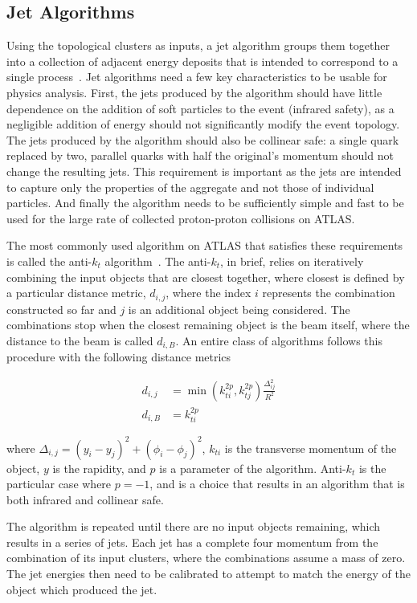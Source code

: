 \subsection{Jet Algorithms}
Using the topological clusters as inputs, a jet algorithm groups them together into a collection of adjacent energy deposits that is intended to correspond to a single process~\cite{ATL-PHYS-PUB-2015-036}.
Jet algorithms need a few key characteristics to be usable for physics analysis.
First, the jets produced by the algorithm should have little dependence on the addition of soft particles to the event (infrared safety), as a negligible addition of energy should not significantly modify the event topology.
The jets produced by the algorithm should also be collinear safe: a single quark replaced by two, parallel quarks with half the original's momentum should not change the resulting jets.
This requirement is important as the jets are intended to capture only the properties of the aggregate and not those of individual particles.
And finally the algorithm needs to be sufficiently simple and fast to be used for the large rate of collected proton-proton collisions on ATLAS.

The most commonly used algorithm on ATLAS that satisfies these requirements is called the anti-$k_t$ algorithm~\cite{antikt}.
The anti-$k_t$, in brief, relies on iteratively combining the input objects that are closest together, where closest is defined by a particular distance metric, $d_{i,j}$, where the index $i$ represents the combination constructed so far and $j$ is an additional object being considered.
The combinations stop when the closest remaining object is the beam itself, where the distance to the beam is called $d_{i,B}$. 
An entire class of algorithms follows this procedure with the following distance metrics

\begin{align}\label{eq:antikt}
d_{i,j} &= \min(k_{ti}^{2p}, k_{tj}^{2p}) \frac{\Delta_{ij}^2}{R^2} \\
d_{i,B} &= k_{ti}^{2p}
\end{align}

where $\Delta_{i,j} = (y_i - y_j)^2 + (\phi_i - \phi_j)^2$, $k_{ti}$ is the transverse momentum of the object, $y$ is the rapidity, and $p$ is a parameter of the algorithm.
Anti-$k_t$ is the particular case where $p = -1$, and is a choice that results in an algorithm that is both infrared and collinear safe.

The algorithm is repeated until there are no input objects remaining, which results in a series of jets. 
Each jet has a complete four momentum from the combination of its input clusters, where the combinations assume a mass of zero.
The jet energies then need to be calibrated to attempt to match the energy of the object which produced the jet.

